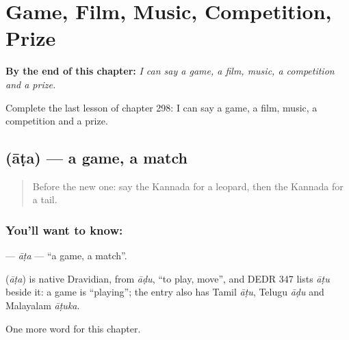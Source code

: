 
\chapter{Game, Film, Music, Competition, Prize}
\label{ch:ka-game-film-music-competition-prize}

\begin{chapteropening}
\textbf{By the end of this chapter:} \emph{I can say a game, a film, music, a competition and a prize.}

Complete the last lesson of chapter 298: I can say a game, a film, music, a competition and a prize.
\end{chapteropening}

\section[\texorpdfstring{\kn{ಆಟ} (āṭa)}{ಆಟ (āṭa)}]{ (āṭa) — a game, a match}

\label{lesson:KA-C298-ata}



\begin{quote}
Before the new one: say the Kannada for a leopard, then the Kannada for a tail.
\end{quote}

\subsection*{You'll want to know: }
\textbf{} — \emph{āṭa} — \textquotedblleft{}a game, a match\textquotedblright{}.

\begin{cousinweb}
\textbf{} (\emph{āṭa}) is native Dravidian, from \emph{āḍu}, \textquotedblleft{}to play, move\textquotedblright{}, and DEDR 347 lists \emph{āṭu} beside it: a game is \textquotedblleft{}playing\textquotedblright{}; the entry also has Tamil \emph{āṭu}, Telugu \emph{āḍu} and Malayalam \emph{āṭuka}.
\end{cousinweb}

\begin{grammarlens}[title={What you've built}]
One more word for this chapter.
\end{grammarlens}


